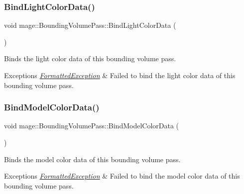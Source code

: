 \subsubsection{\texorpdfstring{Bind\+Light\+Color\+Data()}{BindLightColorData()}}
{\footnotesize\ttfamily void mage\+::\+Bounding\+Volume\+Pass\+::\+Bind\+Light\+Color\+Data (\begin{DoxyParamCaption}{ }\end{DoxyParamCaption})\hspace{0.3cm}{\ttfamily [private]}}

Binds the light color data of this bounding volume pass.


\begin{DoxyExceptions}{Exceptions}
{\em \hyperlink{classmage_1_1_formatted_exception}{Formatted\+Exception}} & Failed to bind the light color data of this bounding volume pass. \\
\hline
\end{DoxyExceptions}
\hypertarget{classmage_1_1_bounding_volume_pass_af4591758a8dfa7cd19a0f87a0273e470}{}\label{classmage_1_1_bounding_volume_pass_af4591758a8dfa7cd19a0f87a0273e470} 
\subsubsection{\texorpdfstring{Bind\+Model\+Color\+Data()}{BindModelColorData()}}
{\footnotesize\ttfamily void mage\+::\+Bounding\+Volume\+Pass\+::\+Bind\+Model\+Color\+Data (\begin{DoxyParamCaption}{ }\end{DoxyParamCaption})\hspace{0.3cm}{\ttfamily [private]}}

Binds the model color data of this bounding volume pass.


\begin{DoxyExceptions}{Exceptions}
{\em \hyperlink{classmage_1_1_formatted_exception}{Formatted\+Exception}} & Failed to bind the model color data of this bounding volume pass. \\
\hline
\end{DoxyExceptions}
\hypertarget{classmage_1_1_bounding_volume_pass_ae84dd1e056235a5fdbc7c496b6b99d1d}{}\label{classmage_1_1_bounding_volume_pass_ae84dd1e056235a5fdbc7c496b6b99d1d} 
